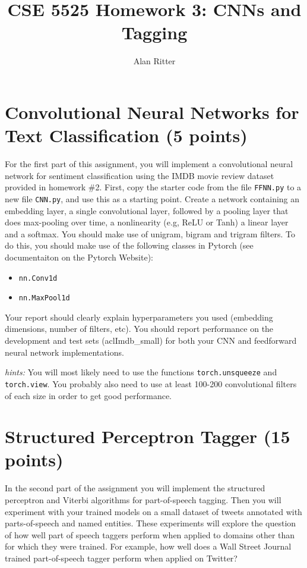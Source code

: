 \documentclass[12pt, letterpaper]{article}
\begin{document}
\title{CSE 5525 Homework 3: CNNs and Tagging}
\author{Alan Ritter}
\date{}
\maketitle

\section{Convolutional Neural Networks for Text Classification (5 points)}
For the first part of this assignment, you will implement a convolutional neural network for sentiment classification using the IMDB movie review dataset provided in homework \#2.
First, copy the starter code from the file {\tt FFNN.py} to a new file {\tt CNN.py}, and use this as a starting point.  Create a network containing an embedding layer, a single
convolutional layer, followed by a pooling layer that does max-pooling over time, a nonlinearity (e.g, ReLU or Tanh) a linear layer and a softmax.  You should make use of unigram, bigram and trigram filters.
To do this, you should make use
of the following classes in Pytorch (see documentaiton on the Pytorch Website):
\begin{itemize}
  \item {\tt nn.Conv1d}
  \item {\tt nn.MaxPool1d}
\end{itemize}

Your report should clearly explain hyperparameters you used (embedding dimensions, number of filters, etc).  You should report performance on the development and test sets (aclImdb\_small) for both your CNN
and feedforward neural network implementations.

{\it hints:} You will most likely need to use the functions {\tt torch.unsqueeze} and {\tt torch.view}.  You probably also need to use at least 100-200 convolutional filters of each size in order to get good performance.

\section{Structured Perceptron Tagger (15 points)}
In the second part of the assignment you will implement the structured perceptron and Viterbi algorithms for part-of-speech
tagging.  Then you will experiment with your trained models on a small dataset of
tweets annotated with parts-of-speech and named entities.  These experiments will explore the question of how well part
of speech taggers perform when applied to domains other than for which they were trained.  For example,
how well does a Wall Street Journal trained part-of-speech tagger perform when applied on Twitter?
\end{document}
